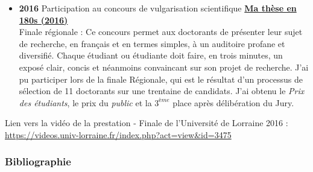 \documentclass[
  11pt,
]{article}
\providecommand{\tightlist}{%
  \setlength{\itemsep}{0pt}\setlength{\parskip}{0pt}}\usepackage{longtable,booktabs,array}
\begin{document}
\begin{itemize}
\tightlist
\item
  \textbf{2016} Participation au concours de vulgarisation scientifique
  \href{http://videos.univ-lorraine.fr/index.php?act=view&id=3475}{\textbf{Ma thèse en 180s (2016)}}\\
  Finale régionale : Ce concours permet aux doctorants de présenter leur
  sujet de recherche, en français et en termes simples, à un auditoire
  profane et diversifié. Chaque étudiant ou étudiante doit faire, en
  trois minutes, un exposé clair, concis et néanmoins convaincant sur
  son projet de recherche. J'ai pu participer lors de la finale
  Régionale, qui est le résultat d'un processus de sélection de 11
  doctorants sur une trentaine de candidats. J'ai obtenu le
  \textit{Prix des étudiants}, le prix du \textit{public} et la
  \(3^{ème}\) place après délibération du Jury.
\end{itemize}

Lien vers la vidéo de la prestation - Finale de l'Université de Lorraine
2016 : \url{https://videos.univ-lorraine.fr/index.php?act=view&id=3475}

\newpage

\hypertarget{bibliographie}{%
\subsubsection{Bibliographie}\label{bibliographie}}
\end{document}
